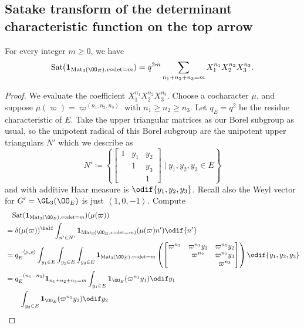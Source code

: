 \subsection{Satake transform of the determinant characteristic function on the top arrow}
\begin{proposition}
  For every integer $m \ge 0$, we have
  \[ \Sat(\mathbf{1}_{\Mat_3(\OO_E), v\circ\det=m})
    = q^{2m} \sum_{n_1 + n_2 + n_3 = m} X_1^{n_1} X_2^{n_2} X_3^{n_3}. \]
\end{proposition}
\begin{proof}
  We evaluate the coefficient $X_1^{n_1} X_2^{n_2} X_3^{n_3}$.
  Choose a cocharacter $\mu$,
  and suppose $\mu(\varpi) = \varpi^{(n_1, n_2, n_3)}$ with $n_1 \ge n_2 \ge n_3$.
  Let $q_E = q^2$ be the residue characteristic of $E$.
  Take the upper triangular matrices as our Borel subgroup as usual,
  so the unipotent radical of this Borel subgroup
  are the unipotent upper triangulars $N'$ which we describe as
  \[ N' \coloneqq \left\{ \begin{bmatrix}
      1 & y_1 & y_2 \\
        & 1 & y_3 \\
        &   & 1 \end{bmatrix} \mid y_1, y_2, y_3 \in E \right\} \]
  and with additive Haar measure is $\odif{y_1,y_2,y_3}$.
  Recall also the Weyl vector for $G' = \GL_3(\OO_E)$ is just $\left< 1,0,-1\right>$.
  Compute
  \begin{align*}
    &\phantom=\Sat(\mathbf{1}_{\Mat_3(\OO_E), v\circ\det=m})(\mu(\varpi)) \\
    &= \delta(\mu(\varpi))^\half \int_{n' \in N'}
      \mathbf{1}_{\Mat_3(\OO_E, v\circ \det = m)} (\mu(\varpi) n') \odif{n'} \\
    &= q_E^{-\left< \mu, \rho\right>} \int_{y_1 \in E} \int_{y_2 \in E} \int_{y_3 \in E}
      \mathbf{1}_{\Mat_3(\OO_E), v \circ \det = m}
      \left(
        \begin{bmatrix}
          \varpi^{n_1} & \varpi^{n_1} y_1 & \varpi^{n_1} y_2 \\
          & \varpi^{n_2} & \varpi^{n_2} y_3 \\
          & & \varpi^{n_3} \\
        \end{bmatrix}
      \right) \odif{y_1,y_2,y_3} \\
    &= q_E^{-(n_1-n_3)} \mathbf{1}_{n_1+n_2+n_3=m}
    \int_{y_1 \in E} \mathbf{1}_{\OO_E}(\varpi^{n_1} y_1) \odif y_1 \\
    &\qquad \int_{y_2 \in E} \mathbf{1}_{\OO_E}(\varpi^{n_1} y_2) \odif y_2

\end{align*}
\end{proof}
